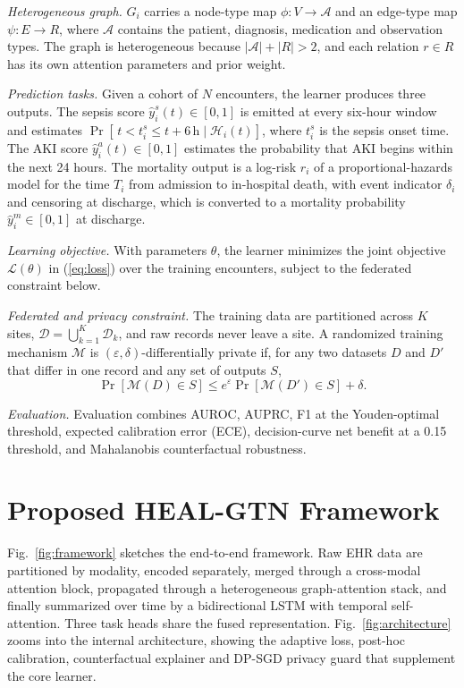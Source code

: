 \documentclass[conference]{IEEEtran}
\begin{document}
\textit{Heterogeneous graph.} $G_i$ carries a node-type map $\phi:V\rightarrow\mathcal{A}$ and an edge-type map $\psi:E\rightarrow R$, where $\mathcal{A}$ contains the patient, diagnosis, medication and observation types. The graph is heterogeneous because $|\mathcal{A}|+|R|>2$, and each relation $r\in R$ has its own attention parameters and prior weight.

\textit{Prediction tasks.} Given a cohort of $N$ encounters, the learner produces three outputs. The sepsis score $\hat{y}^{s}_{i}(t)\in[0,1]$ is emitted at every six-hour window and estimates $\Pr[\,t<t^{s}_i\le t+6\,\mathrm{h}\mid\mathcal{H}_i(t)]$, where $t^{s}_i$ is the sepsis onset time. The AKI score $\hat{y}^{a}_{i}(t)\in[0,1]$ estimates the probability that AKI begins within the next 24 hours. The mortality output is a log-risk $r_i$ of a proportional-hazards model for the time $T_i$ from admission to in-hospital death, with event indicator $\delta_i$ and censoring at discharge, which is converted to a mortality probability $\hat{y}^{m}_i\in[0,1]$ at discharge.

\textit{Learning objective.} With parameters $\theta$, the learner minimizes the joint objective $\mathcal{L}(\theta)$ in (\ref{eq:loss}) over the training encounters, subject to the federated constraint below.

\textit{Federated and privacy constraint.} The training data are partitioned across $K$ sites, $\mathcal{D}=\bigcup_{k=1}^{K}\mathcal{D}_k$, and raw records never leave a site. A randomized training mechanism $\mathcal{M}$ is $(\varepsilon,\delta)$-differentially private if, for any two datasets $D$ and $D'$ that differ in one record and any set of outputs $S$,
\begin{equation}
\Pr[\mathcal{M}(D)\in S]\le e^{\varepsilon}\Pr[\mathcal{M}(D')\in S]+\delta.
\label{eq:dp}
\end{equation}

\textit{Evaluation.} Evaluation combines AUROC, AUPRC, F1 at the Youden-optimal threshold, expected calibration error (ECE), decision-curve net benefit at a 0.15 threshold, and Mahalanobis counterfactual robustness.

\section{Proposed HEAL-GTN Framework}
Fig.~\ref{fig:framework} sketches the end-to-end framework. Raw EHR data are partitioned by modality, encoded separately, merged through a cross-modal attention block, propagated through a heterogeneous graph-attention stack, and finally summarized over time by a bidirectional LSTM with temporal self-attention. Three task heads share the fused representation. Fig.~\ref{fig:architecture} zooms into the internal architecture, showing the adaptive loss, post-hoc calibration, counterfactual explainer and DP-SGD privacy guard that supplement the core learner.
\end{document}
